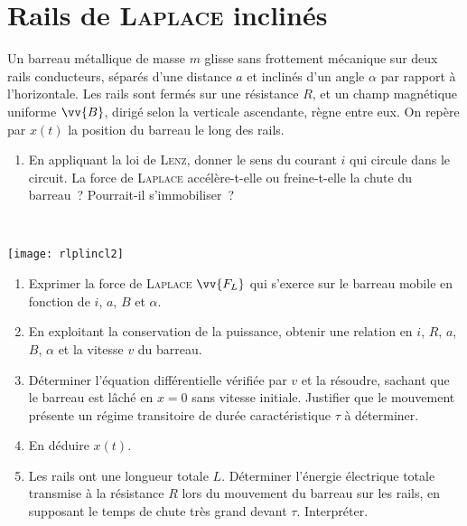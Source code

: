 \documentclass[a4paper, 10pt, final, garamond]{book}
\begin{document}
\section{Rails de \textsc{Laplace} inclinés}
\label{sec:rlplincl}
\noindent
\begin{minipage}[t]{.6\linewidth}
	Un barreau métallique de masse $m$ glisse sans frottement mécanique sur deux
	rails conducteurs, séparés d'une distance $a$ et inclinés d'un angle $\alpha$
	par rapport à l'horizontale. Les rails sont fermés sur une résistance $R$, et
	un champ magnétique uniforme $\vv{B}$, dirigé selon la verticale ascendante,
	règne entre eux. On repère par $x (t)$ la position du barreau le long des
	rails.
	\begin{enumerate}
		\item En appliquant la loi de \textsc{Lenz}, donner le sens du courant $i$ qui
		      circule dans le circuit. La force de \textsc{Laplace} accélère-t-elle ou
		      freine-t-elle la chute du barreau~? Pourrait-il s'immobiliser~?
	\end{enumerate}
\end{minipage}
\hfill
\begin{minipage}[t]{.35\linewidth}
	~
	\vspace*{-10pt}
	\begin{center}
		\texttt{[image: rlplincl2]}
		\label{fig:rlplincl2}
	\end{center}
\end{minipage}
\begin{enumerate}[start=2]
	\item Exprimer la force de \textsc{Laplace} $\vv{F_L}$ qui s'exerce sur le
	      barreau mobile en fonction de $i$, $a$, $B$ et $\alpha$.
	\item En exploitant la conservation de la puissance, obtenir une relation en
	      $i$, $R$, $a$, $B$, $\alpha$ et la vitesse $v$ du barreau.
	\item Déterminer l'équation différentielle vérifiée par $v$ et la résoudre,
	      sachant que le barreau est lâché en $x=0$ sans vitesse initiale. Justifier
	      que le mouvement présente un régime transitoire de durée caractéristique
	      $\tau$ à déterminer.
	\item En déduire $x (t)$.
	\item Les rails ont une longueur totale $L$. Déterminer l'énergie électrique
	      totale transmise à la résistance $R$ lors du mouvement du barreau sur les
	      rails, en supposant le temps de chute très grand devant $\tau$.
	      Interpréter.
\end{enumerate}
\end{document}
